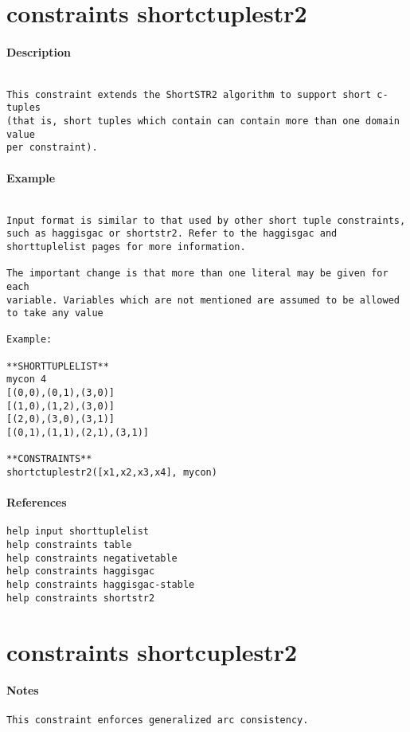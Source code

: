 \section{constraints shortctuplestr2}
\paragraph{Description}
{\footnotesize
\begin{verbatim}

This constraint extends the ShortSTR2 algorithm to support short c-tuples
(that is, short tuples which contain can contain more than one domain value
per constraint).
\end{verbatim}
}
\paragraph{Example}
{\footnotesize
\begin{verbatim}

Input format is similar to that used by other short tuple constraints,
such as haggisgac or shortstr2. Refer to the haggisgac and
shorttuplelist pages for more information.

The important change is that more than one literal may be given for each
variable. Variables which are not mentioned are assumed to be allowed
to take any value

Example:

**SHORTTUPLELIST**
mycon 4
[(0,0),(0,1),(3,0)]
[(1,0),(1,2),(3,0)]
[(2,0),(3,0),(3,1)]
[(0,1),(1,1),(2,1),(3,1)]

**CONSTRAINTS**
shortctuplestr2([x1,x2,x3,x4], mycon)
\end{verbatim}
}
\paragraph{References}
{\footnotesize
\begin{verbatim}
help input shorttuplelist
help constraints table
help constraints negativetable
help constraints haggisgac
help constraints haggisgac-stable
help constraints shortstr2
\end{verbatim}
}
\section{constraints shortcuplestr2}
\paragraph{Notes}
{\footnotesize
\begin{verbatim}
This constraint enforces generalized arc consistency.
\end{verbatim}
}
